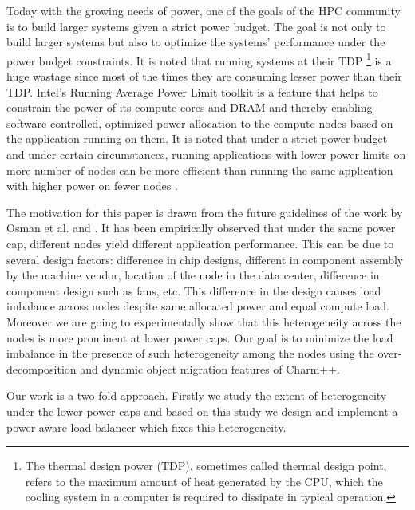 Today with the growing needs of power, one of the goals of the HPC community is
to build larger systems given a strict power budget. The goal is not only to
build larger systems but also to optimize the systems' performance under the
power budget constraints. It is noted that running systems at their TDP
\footnote{ The thermal design power (TDP), sometimes called thermal design
  point, refers to the maximum amount of heat generated by the CPU, which the
    cooling system in a computer is required to dissipate in typical
    operation.} is a huge wastage since most of the times they are consuming
    lesser power than their TDP. Intel's Running Average Power Limit\cite{rapl}
    toolkit is a feature that helps to constrain the power of its compute cores
    and DRAM and thereby enabling software controlled, optimized power
    allocation to the compute nodes based on the application running on them.
    It is noted that under a strict power budget and under certain
    circumstances, running applications with lower power limits on more number
    of nodes can be more efficient than running the same application with higher
    power on fewer nodes \cite{powerCluster2013}.


The motivation for this paper is drawn from the future guidelines of the work
by Osman et al.\cite{powerCluster2013} and \cite{osmanthesis}.  It has been
empirically observed that under the same power cap, different nodes yield
different application performance. This can be due to several design factors:
difference in chip designs, different in component assembly by the machine
vendor, location of the node in the data center, difference in component design
such as fans, etc. This difference in the design causes load imbalance across
nodes despite same allocated power and equal compute load. Moreover we are
going to experimentally show that this heterogeneity across the nodes is more
prominent at lower power caps.  Our goal is to minimize the load imbalance in
the presence of such heterogeneity among the nodes using the over-decomposition
and dynamic object migration features of Charm++\cite{ChareKernelICPP90}.

Our work is a two-fold approach. Firstly we study the extent of heterogeneity
under the lower power caps and based on this study we design and implement a
power-aware load-balancer which fixes this heterogeneity.

